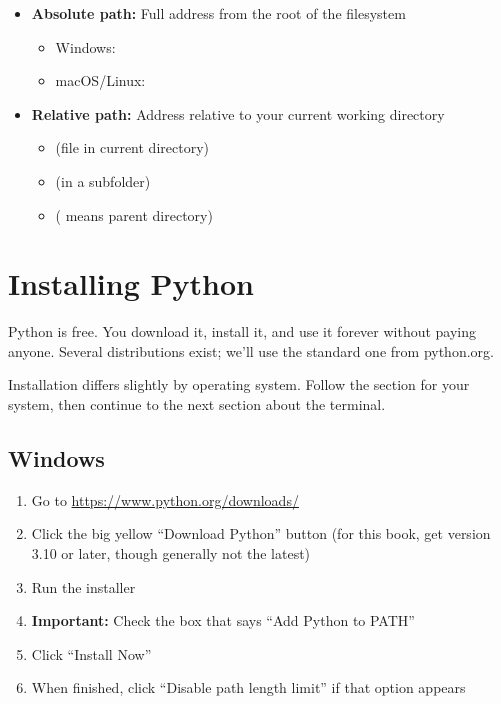 \begin{itemize}
    \item \textbf{Absolute path:} Full address from the root of the filesystem
    \begin{itemize}
        \item Windows: 
        \item macOS/Linux: 
    \end{itemize}
    \item \textbf{Relative path:} Address relative to your current working directory
    \begin{itemize}
        \item {} (file in current directory)
        \item {} (in a subfolder)
        \item {} ( means parent directory)
    \end{itemize}
\end{itemize}


\section{Installing Python}
\label{sec:install-python}

Python is free. You download it, install it, and use it forever without paying anyone. Several distributions exist; we'll use the standard one from python.org.

\begin{osbox}
Installation differs slightly by operating system. Follow the section for your system, then continue to the next section about the terminal.
\end{osbox}

\subsection{Windows}

\begin{enumerate}
    \item Go to \url{https://www.python.org/downloads/}
    \item Click the big yellow ``Download Python'' button (for this book, get version 3.10 or later, though generally not the latest)
    \item Run the installer
    \item \textbf{Important:} Check the box that says ``Add Python to PATH''
    \item Click ``Install Now''
    \item When finished, click ``Disable path length limit'' if that option appears
\end{enumerate}

